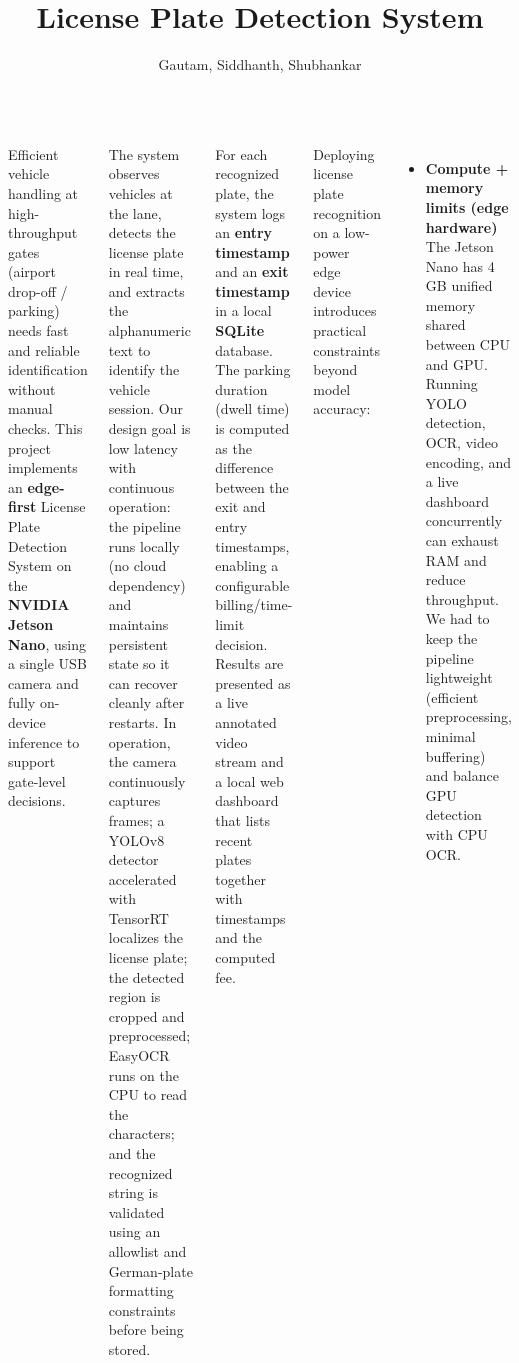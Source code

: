 \documentclass[25pt,a0paper,portrait]{tikzposter}
\title{License Plate Detection System}
\author{Gautam, Siddhanth, Shubhankar}
\begin{document}
	
	\maketitle
	
		\begin{columns}
			
		{
					{
					Efficient vehicle handling at high-throughput gates (airport drop-off / parking) needs fast and reliable identification without manual checks. This project implements an \textbf{edge-first} License Plate Detection System on the \textbf{NVIDIA Jetson Nano}, using a single USB camera and fully on-device inference to support gate-level decisions.\newline
					
						The system observes vehicles at the lane, detects the license plate in real time, and extracts the alphanumeric text to identify the vehicle session. Our design goal is low latency with continuous operation: the pipeline runs locally (no cloud dependency) and maintains persistent state so it can recover cleanly after restarts. In operation, the camera continuously captures frames; a YOLOv8 detector accelerated with TensorRT localizes the license plate; the detected region is cropped and preprocessed; EasyOCR runs on the CPU to read the characters; and the recognized string is validated using an allowlist and German-plate formatting constraints before being stored.\newline
						
						For each recognized plate, the system logs an \textbf{entry timestamp} and an \textbf{exit timestamp} in a local \textbf{SQLite} database. The parking duration (dwell time) is computed as the difference between the exit and entry timestamps, enabling a configurable billing/time-limit decision. Results are presented as a live annotated video stream and a local web dashboard that lists recent plates together with timestamps and the computed fee.
						
					}
				
				{
				Deploying license plate recognition on a low-power edge device introduces practical constraints beyond model accuracy:\newline
				
					\begin{itemize}
						\item \textbf{Compute + memory limits (edge hardware)}\\
						The Jetson Nano has 4\,GB unified memory shared between CPU and GPU. Running YOLO detection, OCR, video encoding, and a live dashboard concurrently can exhaust RAM and reduce throughput. We had to keep the pipeline lightweight (efficient preprocessing, minimal buffering) and balance GPU detection with CPU OCR.
						

\end{itemize}}}
\end{columns}
\end{document}
